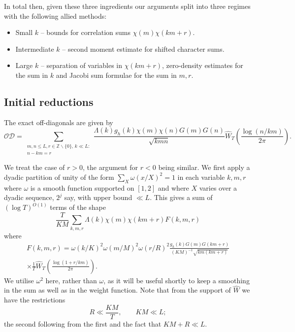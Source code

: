 \documentclass[12pt, oneside]{amsart}
\theoremstyle{definition}
\newcommand{\mb}{\mathbb}
\newcommand{\mc}{\mathcal}
\newcommand{\leqs}{\leqslant }
\newcommand{\wh}{\widehat}
\newcommand{\eps}{\varepsilon}
\newcommand{\1}{\mathds{1}}
\begin{document}
In total then, given these three ingredients our arguments split into three regimes with the following allied methods: 
\begin{itemize}
\item Small $k$ -- bounds for correlation sums $\chi(m)\chi(km+r)$.
\item Intermediate $k$ -- second moment estimate for shifted character sums.
\item Large $k$ -- separation of variables in $\chi(km+r)$, zero-density estimates for the sum in $k$ and Jacobi sum formulae for the sum in $m,r$.
\end{itemize}
  
\subsection{Initial reductions} The exact off-diagonals are given by 
\[
\mc{OD}
=
\sum_{\substack{m,n\leqs L, r\in\mb{Z}\backslash\{0\},\, k\ll L:\\n-km=r}} \frac{\Lambda(k)g_h(k)\chi(m)\chi(n)G(m)G(n)}{\sqrt{kmn}}
\wh W_T\!\left(\frac{\log(n/km)}{2\pi}\right).
\]

We treat the case of $r>0$, the argument for $r<0$ being similar.
We first apply a dyadic partition of unity of the form $\sum_{X}\omega(x/X)^2=1$ in each variable $k,m,r$ where $\omega$ is a smooth function supported on $[1,2]$ and where $X$ varies over a dyadic sequence, $2^j$ say, with upper bound $\ll L$. This gives a sum of $(\log T)^{O(1)}$ terms of the shape
\begin{equation}\label{OD term}
\frac{T}{KM}\sum_{k,m, r}\Lambda(k)\chi(m)\chi(km+r)F(k,m,r)
\end{equation}
where 
\begin{multline*}
F(k,m,r)
=
\omega(k/K)^2\omega(m/M)^2\omega(r/R)^2\frac{g_h(k)G(m)G(km+r)}{(KM)^{-1}\sqrt{km(km+r)}}
\\
\times\frac{1}{T}
\wh W_T\!\left(\frac{\log(1+r/km)}{2\pi}\right).
\end{multline*}
We utilise $\omega^2$ here, rather than $\omega$, as it will be useful shortly to keep a smoothing in the sum as well as in the weight function.  
Note that from the support of $\wh W$ we have the restrictions
\[
R\ll \frac{KM}{T},\qquad KM\ll L;
\]
the second following from the first and the fact that $KM+R\ll L$. 

\end{document}
